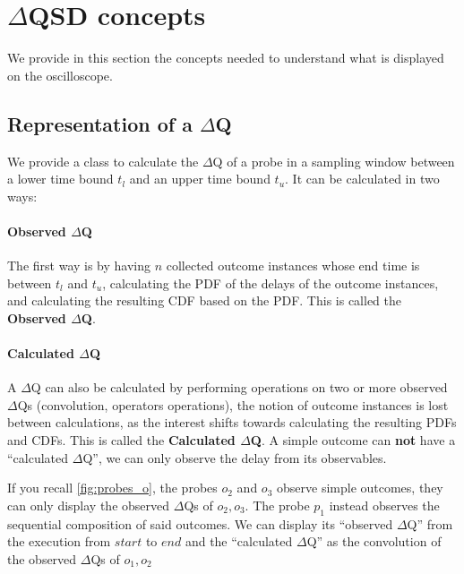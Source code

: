 \section{$\Delta$QSD concepts}

    We provide in this section the concepts needed to understand what is displayed on the oscilloscope.

\subsection{Representation of a $\Delta$Q}
    We provide a class to calculate the $\Delta$Q of a probe in a sampling window between a lower time bound $t_l$ and an upper time bound $t_u$. It can be calculated in two ways: 
    
    \paragraph{Observed $\Delta$Q}
    
    The first way is by having $n$ collected outcome instances whose end time is between $t_l$ and $t_u$, calculating the PDF of the delays of the outcome instances, and calculating the resulting CDF based on the PDF. This is called the \textbf{Observed $\Delta$Q}.
    
    \paragraph{Calculated $\Delta$Q}
    
    A $\Delta$Q can also be calculated by performing operations on two or more observed $\Delta$Qs (convolution, operators operations), the notion of outcome instances is lost between calculations, as the interest shifts towards calculating the resulting PDFs and CDFs. This is called the \textbf{Calculated $\Delta$Q}. A simple outcome can \textbf{not} have a ``calculated $\Delta$Q'', we can only observe the delay from its observables.

    If you recall \cref{fig:probes_o}, the probes $o_2$ and $o_3$ observe simple outcomes, they can only display the observed $\Delta$Qs of $o_2, o_3$. The probe $p_1$ instead observes the sequential composition of said outcomes. We can display its ``observed $\Delta$Q'' from the execution from $start$ to $end$ and the ``calculated $\Delta$Q'' as the convolution of the observed $\Delta$Qs of $o_1, o_2$
        
